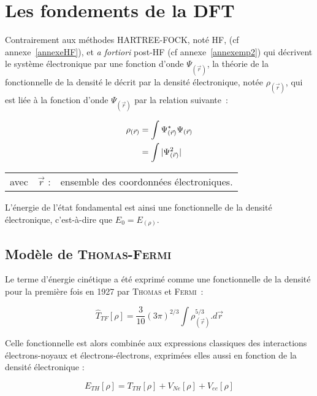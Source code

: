 \newpage

\section{Les fondements de la DFT}

Contrairement aux méthodes HARTREE-FOCK, noté HF, (cf annexe~\ref{annexeHF}), et \textit{a fortiori} post-HF (cf annexe~\ref{annexemp2}) qui décrivent le système électronique par une fonction d'onde $\Psi_{(\vec{r})}$, la théorie de la fonctionnelle de la densité le décrit par la densité électronique, notée $\rho_{(\vec{r})}$, qui est liée à la fonction d'onde $\Psi_{(\vec{r})}$ par la relation suivante~:

\begin{align}
\rho_{(\vec{r})} &= \int \Psi_{(\vec{r})}^{*} \Psi_{(\vec{r})} \\
&= \int |\Psi_{(\vec{r})}^{2}| \notag
\end{align}

\begin{flushleft}
\begin{tabular}{@{}lrp{10cm}}
avec & $\vec{r}$ : & ensemble des coordonnées électroniques. 
\end{tabular}
\end{flushleft}


L'énergie de l'état fondamental est ainsi une fonctionnelle de la densité électronique, c'est-à-dire que $E_{0} = E_{(\rho)}$.

\subsection{Modèle de \textsc{Thomas-Fermi}}

Le terme d'énergie cinétique a été exprimé comme une fonctionnelle de la densité pour la première fois en 1927 par \textsc{Thomas} et \textsc{Fermi}~:

\begin{equation}
\hat{T}_{TF}[\rho] = \frac{3}{10} (3\pi)^{2/3} \int \rho_{(\vec{r})}^{5/3} .d\vec{r}
\label{ener_cin_thom_ferm}
\end{equation}

Celle fonctionnelle est alors combinée aux expressions classiques des interactions électrons-noyaux et électrons-électrons, exprimées elles aussi en fonction de la densité électronique :

\begin{equation}
E_{TH}[\rho] = T_{TH}[\rho] + V_{Ne}[\rho] + V_{ee}[\rho]
\end{equation}

